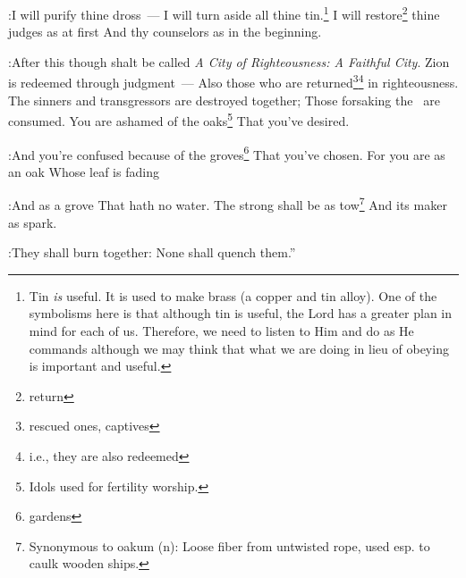 \begin{inparaenum}
:I will purify thine dross~--- I will turn aside all thine tin.\footnote{Tin \emph{is} useful. It is used to make brass (a copper and tin alloy). One of the symbolisms here is that although tin is useful, the Lord has a greater plan in mind for each of us. Therefore, we need to listen to Him and do as He commands although we may think that what we are doing in lieu of obeying is important and useful.}%
   I will restore\footnote{return} thine judges as at first And thy counselors as in the beginning.%

:After this though shalt be called \textit{A City of Righteousness: A Faithful City}.%
   Zion is redeemed through judgment~--- Also those who are returned\footnote{rescued ones, captives}\footnote{i.e., they are also redeemed} in righteousness.%
   The sinners and transgressors are destroyed together; Those forsaking the \lord\ are consumed.%
   You are ashamed of the oaks\footnote{Idols used for fertility worship.} That you've desired.%

:And you're confused because of the groves\footnote{gardens} That you've chosen.%
   For you are as an oak Whose leaf is fading%

:And as a grove That hath no water.%
   The strong shall be as tow\footnote{Synonymous to oakum (n): Loose fiber from untwisted rope, used esp. to caulk wooden ships.} And its maker as spark.%

:They shall burn together: None shall quench them.''%
\end{inparaenum}
